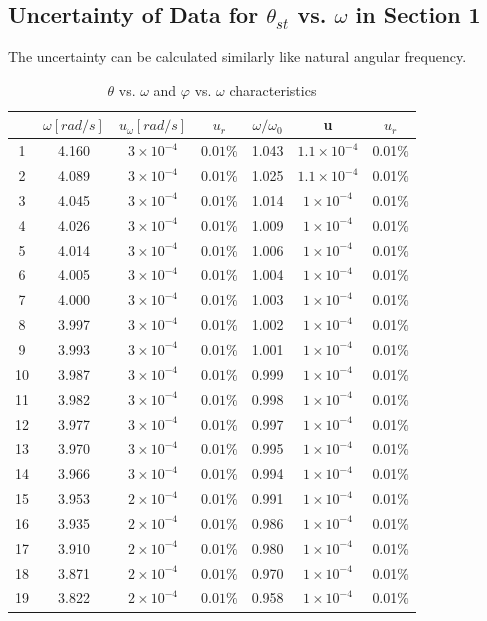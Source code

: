 \documentclass[12pt]{article}
\begin{document}
\subsection{Uncertainty of Data for $\theta_{st}$ vs. $\omega$ in Section 1}
The uncertainty can be calculated similarly like natural angular frequency.
\begin{table}[H]
\centering
\begin{tabular}{|c|c|c|c|c|c|c|}
\hline
   &$\omega[rad/s]$ &$u_{\omega}[rad/s]$&$u_r$&$\omega/\omega_0$&u&$u_r$ \\ \hline
1  & 4.160 & $3\times10^{-4}$ & $0.01\%$&1.043&$1.1\times10^{-4}$&0.01$\%$ \\ \hline
2  & 4.089 & $3\times10^{-4}$ & $0.01\%$&1.025&$1.1\times10^{-4}$&0.01$\%$ \\ \hline
3  & 4.045 & $3\times10^{-4}$ & $0.01\%$&1.014&$1\times10^{-4}$&0.01$\%$\\ \hline
4  & 4.026 & $3\times10^{-4}$ & $0.01\%$&1.009&$1\times10^{-4}$&0.01$\%$ \\ \hline
5  & 4.014 & $3\times10^{-4}$ & $0.01\%$&1.006&$1\times10^{-4}$&0.01$\%$ \\ \hline
6  & 4.005 & $3\times10^{-4}$ & $0.01\%$&1.004&$1\times10^{-4}$&0.01$\%$ \\ \hline
7  & 4.000 & $3\times10^{-4}$ & $0.01\%$&1.003&$1\times10^{-4}$&0.01$\%$ \\ \hline
8  & 3.997 & $3\times10^{-4}$ & $0.01\%$&1.002&$1\times10^{-4}$&0.01$\%$ \\ \hline
9  & 3.993 & $3\times10^{-4}$  & $0.01\%$&1.001&$1\times10^{-4}$&0.01$\%$ \\ \hline
10 & 3.987 & $3\times10^{-4}$  & $0.01\%$&0.999&$1\times10^{-4}$&0.01$\%$ \\ \hline
11 & 3.982 & $3\times10^{-4}$  & $0.01\%$&0.998&$1\times10^{-4}$&0.01$\%$ \\ \hline
12 & 3.977 & $3\times10^{-4}$  & $0.01\%$&0.997&$1\times10^{-4}$&0.01$\%$ \\ \hline
13 & 3.970 & $3\times10^{-4}$  & $0.01\%$&0.995&$1\times10^{-4}$&0.01$\%$ \\ \hline
14 & 3.966 & $3\times10^{-4}$  & $0.01\%$&0.994&$1\times10^{-4}$&0.01$\%$ \\ \hline
15 & 3.953 & $2\times10^{-4}$  & $0.01\%$&0.991&$1\times10^{-4}$&0.01$\%$ \\ \hline
16 & 3.935 & $2\times10^{-4}$  & $0.01\%$&0.986&$1\times10^{-4}$&0.01$\%$ \\ \hline
17 & 3.910 & $2\times10^{-4}$  & $0.01\%$&0.980&$1\times10^{-4}$&0.01$\%$  \\ \hline
18 & 3.871 & $2\times10^{-4}$  & $0.01\%$&0.970&$1\times10^{-4}$&0.01$\%$  \\ \hline
19 & 3.822 & $2\times10^{-4}$  & $0.01\%$&0.958&$1\times10^{-4}$&0.01$\%$  \\ \hline
\end{tabular}
\caption{$\theta$ vs. $\omega$ and $\varphi$ vs. $\omega$ characteristics}
\end{table}
\end{document}
